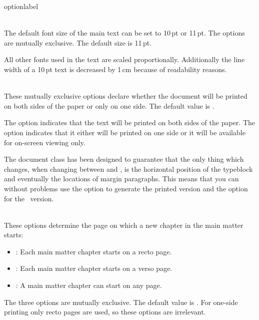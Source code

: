 \begin{labelled}{optionlabel}
\item[10pt \and 11pt]\\
  The default font size of the main text can be set to 10\,pt or 11\,pt.
  The options are mutually exclusive. The default size is 11\,pt.

  All other fonts used in the text are scaled proportionally. Additionally
  the line width of a 10\,pt text is decreased by 1\,cm because of
  readability reasons.

\item[oneside \and twoside]\\
  These mutually exclusive options declare whether the document will be
  printed on both sides of the paper or only on one side. The default value
  is .

  The  option indicates that the text will be printed on both
  sides of the paper. The  option indicates that it either
  will be printed on one side or it will be available for on-screen viewing
  only.

  The  document class has been designed to guarantee that the
  only thing which changes, when changing between  and
  , is the horizontal position of the typeblock and eventually
  the locations of margin paragraphs. This means that you can without
  problems use the  option to generate the printed version and
  the  option for the \PDF\ version.

\item[openright \and openleft \and openany]
  \\
  These options determine the page on which a new chapter in the main
  matter starts:
  \begin{itemize}
  \item {}: Each main matter chapter starts on a recto page.
  \item {}: Each main matter chapter starts on a verso page.
  \item {}: A main matter chapter can start on any page.
  \end{itemize}

  The three options are mutually exclusive. The default value is
  . For one-side printing only recto pages are used, so
  these options are irrelevant.


\end{labelled}
